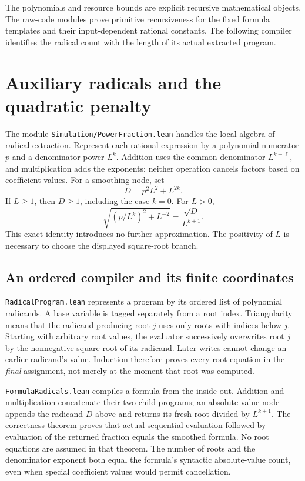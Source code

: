 \documentclass[11pt]{article}
\newcommand{\code}[1]{{\small\nolinkurl{#1}}}
\begin{document}
The polynomials and resource bounds are explicit recursive mathematical
objects. The raw-code modules prove primitive recursiveness for the fixed
formula templates and their input-dependent rational constants. The
following compiler identifies the radical count with the length of its
actual extracted program.

\section{Auxiliary radicals and the quadratic penalty}

The module \code{Simulation/PowerFraction.lean} handles the local algebra
of radical extraction. Represent each rational expression by a polynomial
numerator $p$ and a denominator power $L^k$. Addition uses the common
denominator $L^{k+\ell}$, and multiplication adds the exponents; neither
operation cancels factors based on coefficient values. For a smoothing
node, set
\[
 D=p^2L^2+L^{2k}.
\]
If $L\ge1$, then $D\ge1$, including the case $k=0$. For $L>0$,
\[
 \sqrt{(p/L^k)^2+L^{-2}}=\frac{\sqrt D}{L^{k+1}}.
\]
This exact identity introduces no further approximation. The positivity
of $L$ is necessary to choose the displayed square-root branch.

\subsection{An ordered compiler and its finite coordinates}

\code{RadicalProgram.lean} represents a program by its ordered list of
polynomial radicands. A base variable is tagged separately from a root
index. Triangularity means that the radicand producing root $j$ uses only
roots with indices below $j$. Starting with arbitrary root values, the
evaluator successively overwrites root $j$ by the nonnegative square root
of its radicand. Later writes cannot change an earlier radicand's value.
Induction therefore proves every root equation in the \emph{final}
assignment, not merely at the moment that root was computed.

\code{FormulaRadicals.lean} compiles a formula from the inside out.
Addition and multiplication concatenate their two child programs;
an absolute-value node appends the radicand $D$ above and returns its
fresh root divided by $L^{k+1}$. The correctness theorem proves that
actual sequential evaluation followed by evaluation of the returned
fraction equals the smoothed formula. No root equations are assumed in
that theorem. The number of roots and the denominator exponent both
equal the formula's syntactic absolute-value count, even when special
coefficient values would permit cancellation.
\end{document}
